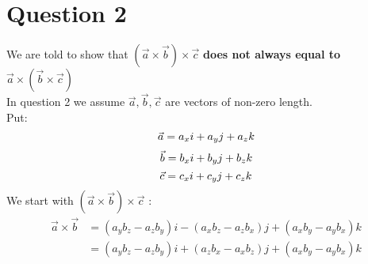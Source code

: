\documentclass[10pt]{article}
\begin{document}
\section{Question 2}
We are told to show that $ (\vec{a} \times \vec{b}) \times \vec{c}$ \textbf{does not always equal to} $\vec{a} \times (\vec{b} \times \vec{c})$ \\ 
In question 2 we assume $\vec{a},\vec{b},\vec{c}$ are vectors of non-zero length. \\
Put: \\
\begin{equation}
\vec{a}=a_xi+a_yj+a_zk\\
\end{equation}
\begin{equation}
\vec{b}=b_xi+b_yj+b_zk\\
\end{equation}
\begin{equation}
\vec{c}=c_xi+c_yj+c_zk\\
\end{equation}
We start with $(\vec{a} \times \vec{b}) \times \vec{c}$ :
\begin{align*}
\vec{a} \times \vec{b}&=(a_yb_z-a_zb_y)i-(a_xb_z-a_zb_x)j+(a_xb_y-a_yb_x)k \\
&=(a_yb_z-a_zb_y)i+(a_zb_x-a_xb_z)j+(a_xb_y-a_yb_x)k
\end{align*}
\end{document}
